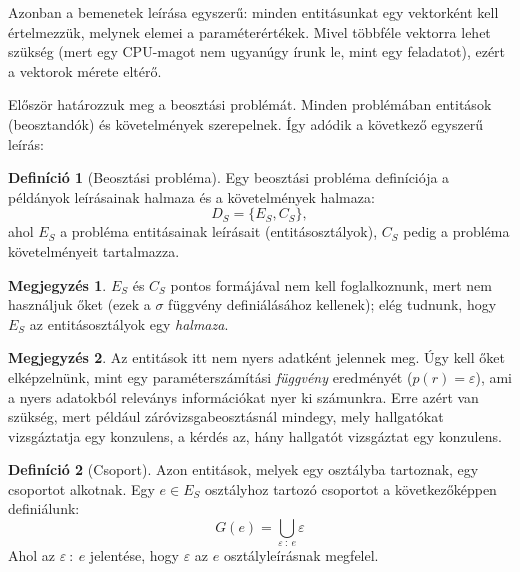 \documentclass{article}
\theoremstyle{definition}
\newtheorem{definition}{Definíció}[section]
\newtheorem*{megj}{Megjegyzés}
\newcommand{\set}[1]{ \{ {#1} \} }
\begin{document}
\begin{multicols}{2}
    Azonban a bemenetek leírása egyszerű: minden entitásunkat egy vektorként kell értelmezzük, melynek elemei a paraméterértékek. Mivel többféle vektorra lehet szükség (mert egy CPU-magot nem ugyanúgy írunk le, mint egy feladatot), ezért a vektorok mérete eltérő.
    
    Először határozzuk meg a beosztási problémát. Minden problémában entitások (beosztandók) és követelmények szerepelnek. Így adódik a következő egyszerű leírás:
    
    \begin{definition}[Beosztási probléma]\label{def:problema}
        Egy beosztási probléma definíciója a példányok leírásainak halmaza és a követelmények halmaza:
        \begin{equation}
            D_S = \set{E_S, C_S},
        \end{equation}
        ahol $E_S$ a probléma entitásainak leírásait (entitásosztályok), $C_S$ pedig a probléma követelményeit tartalmazza.
        \begin{megj}
            $E_S$ és $C_S$ pontos formájával nem kell foglalkoznunk, mert nem használjuk őket (ezek a $\sigma$ függvény definiálásához kellenek); elég tudnunk, hogy $E_S$ az entitásosztályok egy {\it halmaza}.
        \end{megj}
        \begin{megj} \label{megj:param_func}
            Az entitások itt nem nyers adatként jelennek meg. Úgy kell őket elképzelnünk, mint egy paraméterszámítási {\it függvény} eredményét ($p(r) = \varepsilon$), ami a nyers adatokból releványs információkat nyer ki számunkra. Erre azért van szükség, mert például záróvizsgabeosztásnál mindegy, mely hallgatókat vizsgáztatja egy konzulens, a kérdés az, hány hallgatót vizsgáztat egy konzulens.
        \end{megj}
    \end{definition}
    
    \begin{definition}[Csoport]
        Azon entitások, melyek egy osztályba tartoznak, egy csoportot alkotnak. Egy $e \in E_S$ osztályhoz tartozó csoportot a következőképpen definiálunk:
        \begin{equation}
            G(e) = \bigcup_{\varepsilon \ : \ e} \varepsilon
        \end{equation}
        Ahol az $\varepsilon \ : \ e$ jelentése, hogy $\varepsilon$ az $e$ osztályleírásnak megfelel. 
    \end{definition}
    

\end{multicols}
\end{document}
